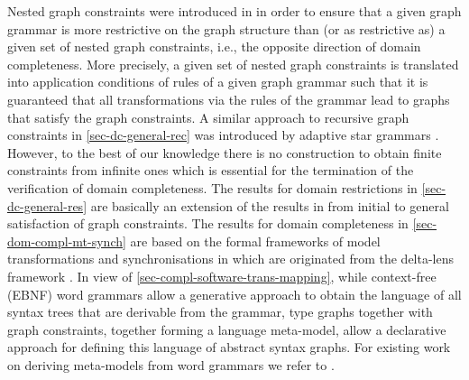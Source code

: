 Nested graph constraints were introduced in \cite{DBLP:journals/mscs/HabelP09} in order to ensure that a given graph grammar is more restrictive on the graph structure than (or as restrictive as) a given set of nested graph constraints, i.e., the opposite direction of domain completeness.
More precisely, a given set of nested graph constraints is translated into application conditions of rules of a given graph grammar such that it is guaranteed that all transformations via the rules of the grammar lead to graphs that satisfy the graph constraints.
A similar approach to recursive graph constraints in \cref{sec-dc-general-rec} was introduced by adaptive star grammars \cite{Drewes2006}.
However, to the best of our knowledge there is no construction to obtain finite constraints from infinite ones which is essential for the termination of the verification of domain completeness.
The results for domain restrictions in \cref{sec-dc-general-res} are basically an extension of the results in \cite{DBLP:journals/corr/abs-1209-1436} from initial to general satisfaction of graph constraints.
The results for domain completeness in \cref{sec-dom-compl-mt-synch} are based on the formal frameworks of model transformations and synchronisations in \cite{FAGT2} which are originated from the delta-lens framework \cite{DBLP:conf/icmt/DiskinXC10,DBLP:conf/models/DiskinXCEHO11,DBLP:conf/models/DiskinXC10,DBLP:conf/staf/JohnsonR15}.
In view of \cref{sec-compl-software-trans-mapping}, while context-free (EBNF) word grammars allow a generative approach to obtain the language of all syntax trees that are derivable from the grammar, type graphs together with graph constraints, together forming a language meta-model, allow a declarative approach for defining this language of abstract syntax graphs.
For existing work on deriving meta-models from word grammars we refer to \cite{DBLP:conf/models/BergmayrW13}.

